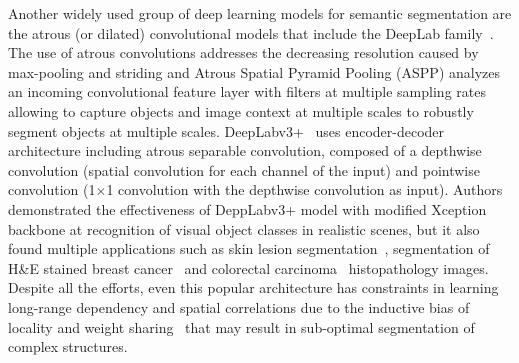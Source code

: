 Another widely used group of deep learning models for semantic segmentation are the atrous (or dilated) convolutional models that include the DeepLab family~\cite{chen2017deeplab, chen2017rethinking}. The use of atrous convolutions addresses the decreasing resolution caused by max-pooling and striding and Atrous Spatial Pyramid Pooling (ASPP) analyzes an incoming convolutional feature layer with filters at multiple sampling rates allowing to capture objects and image context at multiple scales to robustly segment objects at multiple scales. DeepLabv3+~\cite{chen2018encoder} uses encoder-decoder architecture including atrous separable convolution, composed of a depthwise convolution (spatial convolution for each channel of the input) and pointwise convolution (1$\times$1 convolution with the depthwise convolution as input). Authors~\cite{chen2018encoder} demonstrated the effectiveness of DeppLabv3+ model with modified Xception backbone at recognition of visual object classes in realistic scenes, but it also found multiple applications such as skin lesion segmentation~\cite{azad2020attention}, segmentation of H\&E stained breast cancer~\cite{priego2020automatic} and colorectal carcinoma~\cite{xu2022spatial} histopathology images. Despite all the efforts, even this popular architecture has constraints in learning long-range dependency and spatial correlations due to the inductive bias of locality and weight sharing~\cite{xie2021cotr} that may result in sub-optimal segmentation of complex structures. 

